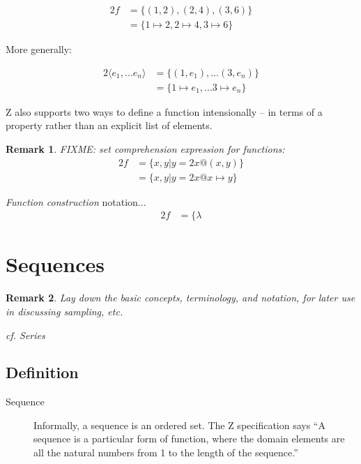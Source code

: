 \documentclass[reqno,12pt]{tufte-book}
\numberwithin{equation}{subsection}
\newtheorem{remark}{Remark}
\begin{document}
\begin{alignat}{2}
  f &= \{(1,2),(2,4),(3,6)\} \\
  &= \{1\mapsto 2, 2\mapsto 4, 3\mapsto 6\}
\end{alignat}

\noindent More generally:

\begin{alignat}{2}
  \langle e_1,\ldots e_n\rangle &= \{(1,e_1),\ldots (3,e_n)\} \\
  &= \{1\mapsto e_1,\ldots 3\mapsto e_n\}
\end{alignat}

Z also supports two ways to define a function intensionally -- in
terms of a property rather than an explicit list of elements.

\begin{remark}
FIXME: set comprehension expression for functions:
\begin{alignat}{2}
  f &= \{x,y | y=2x @ (x,y)\} \\
  &= \{x,y | y=2x @ x\mapsto y\}
\end{alignat}
\end{remark}

\textit{Function construction} notation...
\begin{alignat}{2}
  f &= \{\lambda
\end{alignat}


\section{Sequences}
\label{subs:sequences}

\begin{remark}
  Lay down the basic concepts, terminology, and notation, for later
  use in discussing sampling, etc.

  cf. Series
\end{remark}

\subsection{Definition}

\begin{description}
\item [Sequence] Informally, a sequence is an ordered set.  The Z
  specification says ``A sequence is a particular form of function,
  where the domain elements are all the natural numbers from 1 to the
  length of the sequence.''
\end{description}
\end{document}
